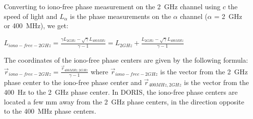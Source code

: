 Converting to iono-free phase measurement on the \SI{2}{\GHz} channel using \(c\)  the speed 
of light and \(L_{\alpha}\) is the phase measurements on the \(\alpha\) channel 
(\(\alpha\) = \SI{2}{\GHz} or \SI{400}{\MHz}), we get:

\(L_{iono-free-2GHz} = \frac{\gamma L_{2GHz} - \sqrt{\gamma}L_{400MHz}}{\gamma - 1} 
= L_{2GHz} + \frac{L_{2GHz} - \sqrt{\gamma}L_{400MHz}}{\gamma - 1} \)

The coordinates of the iono-free phase centers are given by the following formula:
\(\vec{r}_{iono-free-2GHz} = \frac{\vec{r}_{400MHz,2GHz}}{\gamma - 1}\)
where \(\vec{r}_{iono-free-2GHz}\) is the vector from the \SI{2}{\GHz} phase center to 
the iono-free phase center and \(\vec{r}_{400MHz,2GHz}\) is the vector from the 
\SI{400}{\Hz} to the \SI{2}{\GHz} phase center. In DORIS, the iono-free phase centers are
located a few mm away from the \SI{2}{\GHz} phase centers, in the direction opposite to 
the \SI{400}{\MHz} phase centers.
